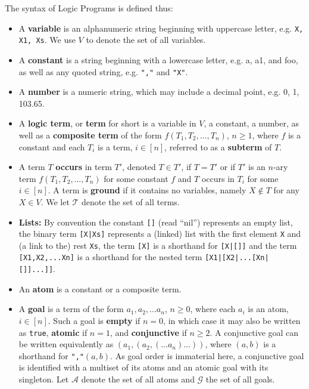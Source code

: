 \documentclass[runningheads,thm-restate]{llncs}
\newcommand{\temph}[1]{\textbf{#1}}  %
\newcommand{\calG}{\mathcal{G}}
\newcommand{\calT}{\mathcal{T}}
\newcommand{\calA}{\mathcal{A}}
\begin{document}
\begin{definition}\label{definition:lp-syntax}
The syntax of Logic Programs is defined thus:
\begin{itemize}
    \item A \temph{variable} is an alphanumeric string beginning with uppercase letter, e.g. \verb|X, X1, Xs|. We use $V$ to denote the set of all variables.
    
    \item A \temph{constant} is a string beginning with a lowercase letter, e.g. a, a1, and foo, as well as any quoted string, e.g. \verb|","| and \verb|"X"|.
    
    \item A \temph{number} is a numeric string, which may include a decimal point, e.g. 0, 1, 103.65.
    
    \item A \temph{logic term}, or \temph{term} for short is a variable in $V$, a constant, a number, as well as a \temph{composite term} of the form $f(T_1,T_2,\ldots,T_n)$, $n \ge 1$, where $f$ is a constant and each $T_i$ is a term, $i \in [n]$, referred to as a \temph{subterm} of $T$.
    \item A term $T$ \temph{occurs} in term $T'$, denoted $T \in T'$, if $T=T'$ or if $T'$ is an $n$-ary term
    $f(T_1,T_2,\ldots,T_n)$ for some constant $f$ and $T$ occurs in $T_i$ for some $i \in [n]$. A term is \temph{ground} if it contains no variables, namely $X \notin T$ for any $X \in V$. We let $\calT$ denote the set of all terms.

    \item \temph{Lists:} By convention the constant \verb|[]| (read ``nil'') represents an empty list, the binary term \verb=[X|Xs]= represents a (linked) list with the first element \verb|X| and (a link to the) rest \verb|Xs|, the term \verb|[X]| is a shorthand for \verb=[X|[]]= and the term \verb=[X1,X2,...Xn]= is a shorthand for the nested term \verb=[X1|[X2|...[Xn|[]]...]]=. 
    
    \item An \temph{atom} is a constant or a composite term.
    
    \item A \temph{goal} is a term of the form $a_1, a_2,\ldots a_n$, $n\ge 0$, where each $a_i$ is an atom, $i \in [n]$. Such a goal is \temph{empty} if $n=0$, in which case it may also be written as \verb|true|, \temph{atomic} if $n=1$, and \temph{conjunctive} if $n \ge 2$. A conjunctive goal can be written equivalently as $(a_1,(a_2,(\ldots a_n)\ldots))$, where $(a,b)$ is a shorthand for \verb|","|$(a,b)$. As goal order is immaterial here, a conjunctive goal is identified with a multiset of its atoms and an atomic goal with its singleton. Let $\calA$ denote the set of all atoms and $\calG$ the set of all goals.


\end{itemize}
\end{definition}
\end{document}
